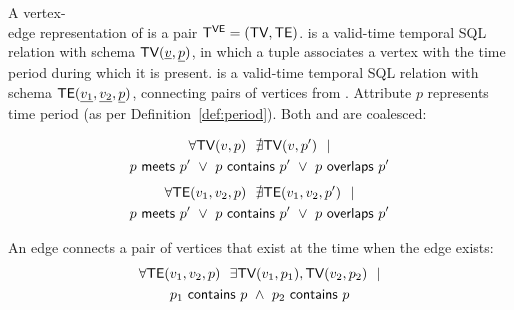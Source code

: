 
\begin{definition}
A vertex-\\edge representation of \tg is a pair $\mathsf{T^{VE}}=(\textsf{TV}, \textsf{TE})$. \tv
is a valid-time temporal SQL relation with schema $\textsf{TV}(\underline{v},
\underline{p})$, in which a tuple associates a vertex with the time
period during which it is present. \te is a valid-time temporal SQL
relation with schema $\textsf{TE}(\underline{v_1}, \underline{v_2},
\underline{p})$, connecting pairs of vertices from \tv.  Attribute $p$
represents time period (as per Definition~\ref{def:period}).  Both \tv
and \te are coalesced:

\begin{multline}
\forall \textsf{TV}(v, p)~~\nexists \textsf{TV}(v, p')~~| \\
                       p~\mathsf{meets}~p'~\lor~p~\mathsf{contains}~p'~\lor~p~\mathsf{overlaps}~p'
\label{def:tg:c2}
\end{multline}
\vspace{-0.5cm}
\begin{multline}
\forall \textsf{TE}(v_1, v_2, p)~~\nexists \textsf{TE}(v_1,v_2, p')~~| \\
                       p~\mathsf{meets}~p'~\lor~p~\mathsf{contains}~p'~\lor~p~\mathsf{overlaps}~p'
\label{def:tg:c3}
\end{multline}

An edge connects a pair of vertices that exist at the time when the edge exists:
\begin{multline}
\forall \textsf{TE}(v_1, v_2, p)~~\exists \textsf{TV}(v_1, p_1), \textsf{TV}(v_2, p_2)~~| \\
                       p_1~\mathsf{contains}~p~\wedge~p_2~\mathsf{contains}~p
\label{def:tg:c1}
\end{multline}
\vspace{-0.5cm}


\end{definition}
